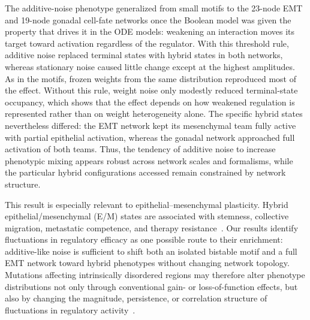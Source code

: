 \documentclass[11pt]{article}
\providecommand{\DIFaddtex}[1]{{\protect\color{red}#1}} %
\providecommand{\DIFdeltex}[1]{} %
\providecommand{\DIFaddbegin}{} %
\providecommand{\DIFaddend}{} %
\providecommand{\DIFdelbegin}{} %
\providecommand{\DIFdelend}{} %
\providecommand{\DIFadd}[1]{\texorpdfstring{\DIFaddtex{#1}}{#1}} %
\providecommand{\DIFdel}[1]{\texorpdfstring{\DIFdeltex{#1}}{}} %
\providecommand{\DIFaddincludegraphics}[2][]{\DIFOincludegraphics[#1]{#2}} %
\providecommand{\DIFdelincludegraphics}[2][]{}
\DeclareRobustCommand{\DIFaddbegin}{\DIFOaddbegin \let\includegraphics\DIFaddincludegraphics} %
\DeclareRobustCommand{\DIFaddend}{\DIFOaddend \let\includegraphics\DIFOincludegraphics} %
\DeclareRobustCommand{\DIFdelbegin}{\DIFOdelbegin \let\includegraphics\DIFdelincludegraphics} %
\DeclareRobustCommand{\DIFdelend}{\DIFOaddend \let\includegraphics\DIFOincludegraphics} %
\begin{document}
The additive-noise phenotype generalized from small motifs to the 23-node EMT and 19-node gonadal cell-fate networks \DIFdelbegin \DIFdel{despite the change from an ODE to a Boolean formalism. In both networks}\DIFdelend \DIFaddbegin \DIFadd{once the Boolean model was given the property that drives it in the ODE models: weakening an interaction moves its target toward activation regardless of the regulator. With this threshold rule}\DIFaddend , additive noise \DIFdelbegin \DIFdel{sharply reduced terminal-state occupancy and generated hybrid-dominated landscapes}\DIFdelend \DIFaddbegin \DIFadd{replaced terminal states with hybrid states in both networks}\DIFaddend , whereas stationary \DIFdelbegin \DIFdel{and multiplicative noise caused comparatively little disruption. }\DIFdelend \DIFaddbegin \DIFadd{noise caused little change except at the highest amplitudes. As in the motifs, frozen weights from the same distribution reproduced most of the effect. Without this rule, weight noise only modestly reduced terminal-state occupancy, which shows that the effect depends on how weakened regulation is represented rather than on weight heterogeneity alone. }\DIFaddend The specific hybrid states nevertheless differed: the EMT network \DIFdelbegin \DIFdel{retained partial polarization toward one of its two regulatory teams}\DIFdelend \DIFaddbegin \DIFadd{kept its mesenchymal team fully active with partial epithelial activation}\DIFaddend , whereas the gonadal network approached \DIFdelbegin \DIFdel{approximately equal }\DIFdelend \DIFaddbegin \DIFadd{full }\DIFaddend activation of both teams. Thus, the tendency of additive noise to increase phenotypic mixing appears robust across network scales \DIFaddbegin \DIFadd{and formalisms}\DIFaddend , while the particular hybrid configurations accessed remain constrained by network structure.

This result is especially relevant to epithelial--mesenchymal plasticity. Hybrid epithelial/mesenchymal (E/M) states are associated with stemness, collective migration, metastatic competence, and therapy resistance~\cite{Pastushenko2019EMTMetastasis, jolly2015implications, pasani2020hybrid, Sahoo2021}. Our results identify fluctuations in regulatory efficacy as one possible route to their enrichment: additive-like noise is sufficient to shift both an isolated bistable motif and a full EMT network toward hybrid phenotypes without changing network topology. Mutations affecting intrinsically disordered regions may therefore alter phenotype distributions not only through conventional gain- or loss-of-function effects, but also by changing the magnitude, persistence, or correlation structure of fluctuations in regulatory activity~\cite{Kulkarni2023IntrinsicallyLater}.
\end{document}

